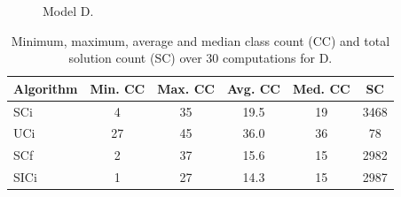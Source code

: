 \documentclass[a4paper, 12pt]{scrartcl}
\begin{document}
\begin{figure}
\centering
{}%
\hfill
{}%
\caption{Model D.}
\end{figure}

\begin{table}%
\centering
\begin{tabular}{lccccc}
Algorithm & Min. CC & Max. CC & Avg. CC & Med. CC & SC\\
\hline
SCi & 4 & 35 & 19.5 & 19 & 3468\\
UCi & 27 & 45 & 36.0 & 36 & 78\\
SCf & 2 & 37 & 15.6 & 15 & 2982\\
SICi & 1 & 27 & 14.3 & 15 & 2987
\end{tabular}
\caption{Minimum, maximum, average and median class count (CC) and total solution count (SC) over 30 computations for D.}
\label{}
\end{table}

\clearpage
\end{document}
